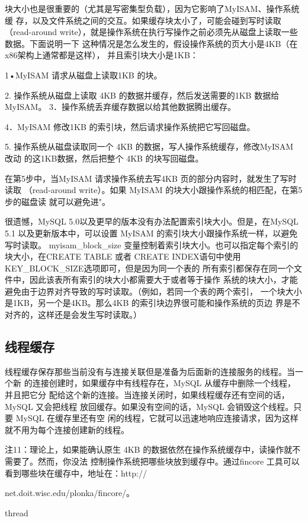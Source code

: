 块大小也是很重要的（尤其是写密集型负载），因为它影响了MyISAM、操作系统缓
存，以及文件系统之间的交互。如果缓存块太小了，可能会碰到写时读取（read-around
write），就是操作系统在执行写操作之前必须先从磁盘上读取一些数据。下面说明一下
这种情况是怎么发生的，假设操作系统的页大小是4KB（在x86架构上通常都是这样），
并且索引块大小是1KB：

1•MyISAM 请求从磁盘上读取1KB 的块。

2. 操作系统从磁盘上读取 4KB 的数据并缓存，然后发送需要的1KB 数据给 MyISAM。
3．操作系统丢弃缓存数据以给其他数据腾出缓存。

4．MyISAM 修改1KB 的索引块，然后请求操作系统把它写回磁盘。

5. 操作系统从磁盘读取同一个 4KB 的数据，写人操作系统缓存，修改MyISAM 改动
的这1KB数据，然后把整个 4KB 的块写回磁盘。

在第5步中，当MyISAM 请求操作系统去写4KB 页的部分内容时，就发生了写时读取
（read-around write）。如果 MyISAM 的块大小跟操作系统的相匹配，在第5步的磁盘读
就可以避免进"。

很遗憾，MySQL 5.0以及更早的版本没有办法配置索引块大小。但是，在MySQL 5.1
以及更新版本中，可以设置 MyISAM 的索引块大小跟操作系统一样，以避免写时读取。
myisam\_block\_size 变量控制着索引块大小。也可以指定每个索引的块大小，在CREATE
TABLE 或者 CREATE INDEX语句中使用KEY\_BLOCK\_SIZE选项即可，但是因为同一个表的
所有索引都保存在同一个文件中，因此该表所有索引的块大小都需要大于或者等于操作
系统的块大小，才能避免由于边界对齐导致的写时读取。（例如，若同一个表的两个索引，
一个块大小是1KB，另一个是4KB。那么4KB 的索引块边界很可能和操作系统的页边
界是不对齐的，这样还是会发生写时读取。）

\subsection{线程缓存}
线程缓存保存那些当前没有与连接关联但是准备为后面新的连接服务的线程。当一个新
的连接创建时，如果缓存中有线程存在，MySQL 从缓存中删除一个线程，并且把它分
配给这个新的连接。当连接关闭时，如果线程缓存还有空间的话，MySQL 又会把线程
放回缓存。如果没有空间的话，MySQL 会销毁这个线程。只要 MySQL 在缓存里还有空
闲的线程，它就可以迅速地响应连接请求，因为这样就不用为每个连接创建新的线程。

注11：理论上，如果能确认原生 4KB 的数据依然在操作系统缓存中，读操作就不需要了。然而，你没法
控制操作系统把哪些块放到缓存中。通过fincore 工具可以看到哪些块在缓存中，地址在：http://

net.doit.wisc.edu/plonka/fincore/。

thread


